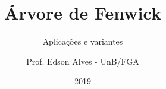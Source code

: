 \title{Árvore de Fenwick}
\subtitle{Aplicações e variantes}
\author{Prof. Edson Alves - UnB/FGA}
\date{2019}
